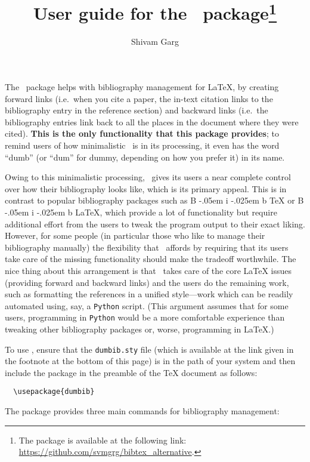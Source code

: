 \documentclass[letter, 11pt]{article}
\title{User guide for the \dumbib\ package\footnote{The package is available at the following link: \url{https://github.com/svmgrg/bibtex_alternative}.}}
\author{Shivam Garg}
\def\Bib{%
  {%
    \rm
    B%
    \kern-.05em%
    {%
      \sc
      i%
      \kern-.025em %
      b%
    }%
  }%
}
\begin{document}
\maketitle

The \dumbib\ package helps with bibliography management for \LaTeX{}, by creating forward links (i.e.\ when you cite a paper, the in-text citation links to the bibliography entry in the reference section) and backward links (i.e.\ the bibliography entries link back to all the places in the document where they were cited). \textbf{This is the only functionality that this package provides}; to remind users of how minimalistic \dumbib\ is in its processing, it even has the word ``dumb'' (or ``dum'' for dummy, depending on how you prefer it) in its name.

Owing to this minimalistic processing, \dumbib\ gives its users a near complete control over how their bibliography looks like, which is its primary appeal. This is in contrast to popular bibliography packages such as \Bib\TeX{} or \Bib\LaTeX, which provide a lot of functionality but require additional effort from the users to tweak the program output to their exact liking. However, for some people (in particular those who like to manage their bibliography manually) the flexibility that \dumbib\ affords by requiring that its users take care of the missing functionality should make the tradeoff worthwhile. The nice thing about this arrangement is that \dumbib\ takes care of the core \LaTeX{} issues (providing forward and backward links) and the users do the remaining work, such as formatting the references in a unified style---work which can be readily automated using, say, a \texttt{Python} script. (This argument assumes that for some users, programming in \texttt{Python} would be a more comfortable experience than tweaking other bibliography packages or, worse, programming in \LaTeX.)

To use \dumbib, ensure that the \texttt{dumbib.sty} file (which is available at the link given in the footnote at the bottom of this page) is in the path of your system and then include the package in the preamble of the \TeX{} document as follows:
\begin{verbatim}
  \usepackage{dumbib}
\end{verbatim}
The package provides three main commands for bibliography management:
\end{document}
